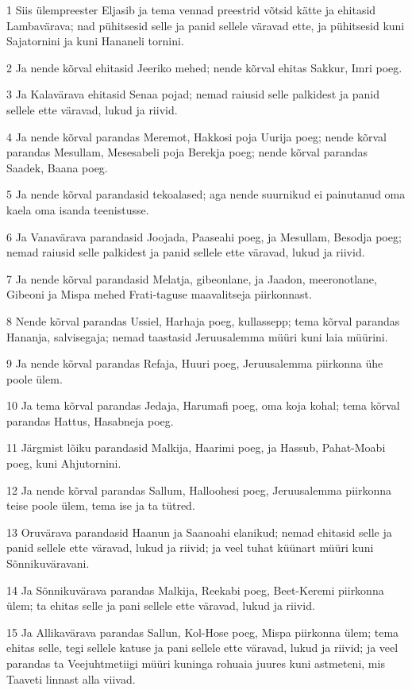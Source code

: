 \par 1 Siis ülempreester Eljasib ja tema vennad preestrid võtsid kätte ja ehitasid Lambavärava; nad pühitsesid selle ja panid sellele väravad ette, ja pühitsesid kuni Sajatornini ja kuni Hananeli tornini.
\par 2 Ja nende kõrval ehitasid Jeeriko mehed; nende kõrval ehitas Sakkur, Imri poeg.
\par 3 Ja Kalavärava ehitasid Senaa pojad; nemad raiusid selle palkidest ja panid sellele ette väravad, lukud ja riivid.
\par 4 Ja nende kõrval parandas Meremot, Hakkosi poja Uurija poeg; nende kõrval parandas Mesullam, Mesesabeli poja Berekja poeg; nende kõrval parandas Saadek, Baana poeg.
\par 5 Ja nende kõrval parandasid tekoalased; aga nende suurnikud ei painutanud oma kaela oma isanda teenistusse.
\par 6 Ja Vanavärava parandasid Joojada, Paaseahi poeg, ja Mesullam, Besodja poeg; nemad raiusid selle palkidest ja panid sellele ette väravad, lukud ja riivid.
\par 7 Ja nende kõrval parandasid Melatja, gibeonlane, ja Jaadon, meeronotlane, Gibeoni ja Mispa mehed Frati-taguse maavalitseja piirkonnast.
\par 8 Nende kõrval parandas Ussiel, Harhaja poeg, kullassepp; tema kõrval parandas Hananja, salvisegaja; nemad taastasid Jeruusalemma müüri kuni laia müürini.
\par 9 Ja nende kõrval parandas Refaja, Huuri poeg, Jeruusalemma piirkonna ühe poole ülem.
\par 10 Ja tema kõrval parandas Jedaja, Harumafi poeg, oma koja kohal; tema kõrval parandas Hattus, Hasabneja poeg.
\par 11 Järgmist lõiku parandasid Malkija, Haarimi poeg, ja Hassub, Pahat-Moabi poeg, kuni Ahjutornini.
\par 12 Ja nende kõrval parandas Sallum, Halloohesi poeg, Jeruusalemma piirkonna teise poole ülem, tema ise ja ta tütred.
\par 13 Oruvärava parandasid Haanun ja Saanoahi elanikud; nemad ehitasid selle ja panid sellele ette väravad, lukud ja riivid; ja veel tuhat küünart müüri kuni Sõnnikuväravani.
\par 14 Ja Sõnnikuvärava parandas Malkija, Reekabi poeg, Beet-Keremi piirkonna ülem; ta ehitas selle ja pani sellele ette väravad, lukud ja riivid.
\par 15 Ja Allikavärava parandas Sallun, Kol-Hose poeg, Mispa piirkonna ülem; tema ehitas selle, tegi sellele katuse ja pani sellele ette väravad, lukud ja riivid; ja veel parandas ta Veejuhtmetiigi müüri kuninga rohuaia juures kuni astmeteni, mis Taaveti linnast alla viivad.
